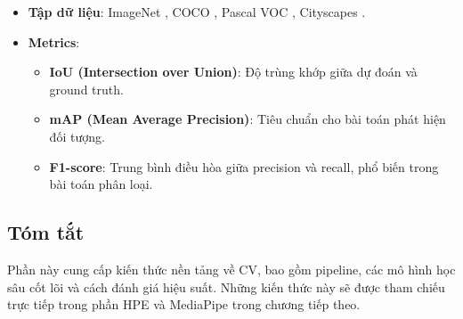 \begin{itemize}
    \item \textbf{Tập dữ liệu}: ImageNet \cite{deng2009imagenet}, COCO \cite{lin2014microsoft}, Pascal VOC \cite{everingham2015pascal}, Cityscapes \cite{cordts2016cityscapes}.
    \item \textbf{Metrics}: 
    \begin{itemize}
        \item \textbf{IoU (Intersection over Union)}: Độ trùng khớp giữa dự đoán và ground truth.
        \item \textbf{mAP (Mean Average Precision)}: Tiêu chuẩn cho bài toán phát hiện đối tượng.
        \item \textbf{F1-score}: Trung bình điều hòa giữa precision và recall, phổ biến trong bài toán phân loại.
    \end{itemize}
\end{itemize}

\subsection{Tóm tắt}
Phần này cung cấp kiến thức nền tảng về CV, bao gồm pipeline, các mô hình học sâu cốt lõi và cách đánh giá hiệu suất. Những kiến thức này sẽ được tham chiếu trực tiếp trong phần HPE và MediaPipe trong chương tiếp theo.
